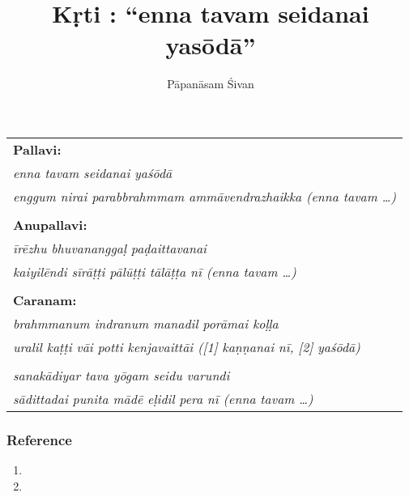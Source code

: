 




\title{K\d rti : ``enna tavam seidanai yas\=od\=a''}
\author{P\=apan\=asam \'Sivan}


\maketitle


\vspace{0.25 in}

\begin{tabular}{l}
\textbf{Pallavi:}\\
\emph{enna tavam seidanai ya\'s\=od\=a}\\
\emph{enggum nirai parabbrahmmam amm\=avendrazhaikka (enna tavam …)}\\
\\
\textbf{Anupallavi:}\\
\emph{\=ir\=ezhu bhuvanangga\d{l} pa\d{d}aittavanai}\\
\emph{kaiyil\=endi s\=ir\=a\d{t}\d{t}i p\=al\=u\d{t}\d{t}i t\=al\=a\d{t}\d{t}a n\=i (enna tavam …)}\\
\\
\textbf{Caranam:}\\
\emph{brahmmanum indranum manadil por\=amai ko\d{l}\d{l}a}\\
\emph{uralil ka\d{t}\d{t}i v\=ai potti kenjavaitt\=ai ({\scriptsize [1]} ka\d{n}\d{n}anai n\=i, {\scriptsize [2]} ya\'s\=od\=a)}\\
\\
\emph{sanak\=adiyar tava y\=ogam seidu varundi}\\
\emph{s\=adittadai punita m\=ad\=e e\d{l}idil pera n\=i (enna tavam …)}
\end{tabular}

\subsubsection*{Reference}

\begin{enumerate}
\item {}
\item {}
\end{enumerate}

  
